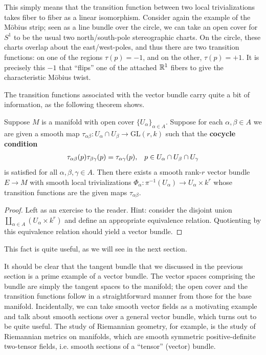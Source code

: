 \documentclass{../../mathnotes}
\begin{document}
This simply means that the transition function between two local trivializations takes fiber to fiber as a linear isomorphism.
Consider again the example of the M\"obius strip; seen as a line bundle over the circle, we can take an open cover for $S^1$ to
be the usual two north/south-pole stereographic charts. On the circle, these charts overlap about the east/west-poles, and thus there
are two transition functions: on one of the regions $\tau(p)=-1$, and on the other, $\tau(p)=+1$. It is precisely this $-1$ that
``flips'' one of the attached $\mathbb{R}^1$ fibers to give the characteristic M\"obius twist.


The transition functions associated with the vector bundle carry quite a bit of information, as the following theorem shows.

\begin{thm}
    Suppose $M$ is a manifold with open cover $\{U_\alpha\}_{\alpha\in A}$. Suppose for each $\alpha,\beta\in A$ we are given
    a smooth map $\tau_{\alpha\beta}:U_\alpha\cap U_\beta\to \text{GL}(r,k)$ such that the \textbf{cocycle condition}
    \[\begin{array}[]{cc}
            \tau_{\alpha\beta}(p)\tau_{\beta\gamma}(p)=\tau_{\alpha\gamma}(p),&p\in U_\alpha\cap U_\beta\cap U_\gamma
        \end{array}
    \]
    is satisfied for all $\alpha,\beta,\gamma\in A$. Then there exists a smooth rank-$r$ vector bundle $E\to M$ with smooth local trivializations
    $\Phi_\alpha:\pi^{-1}\left( U_\alpha \right)\to U_\alpha\times k^r$ whose transition functions are the given maps $\tau_{\alpha\beta}$.
\end{thm}
\begin{proof}
    Left as an exercise to the reader. Hint: consider the disjoint union $\coprod_{\alpha\in A}\left( U_\alpha\times k^r \right)$ and define
    an appropriate equivalence relation. Quotienting by this equivalence relation should yield a vector bundle.
\end{proof}


This fact is quite useful, as we will see in the next section.

It should be clear that the tangent bundle that we discussed in the previous section is a prime example of a vector bundle. The vector spaces
comprising the bundle are simply the tangent spaces to the manifold; the open cover and the transition functions follow in a straightforward manner
from those for the base manifold. Incidentally, we can take smooth vector fields as a motivating example and talk about smooth sections over a general vector
bundle, which turns out to be quite useful. The study of Riemannian geometry, for example, is the study of Riemannian metrics on manifolds, which are smooth symmetric
positive-definite two-tensor fields, i.e. smooth sections of a ``tensor'' (vector) bundle.
\end{document}
